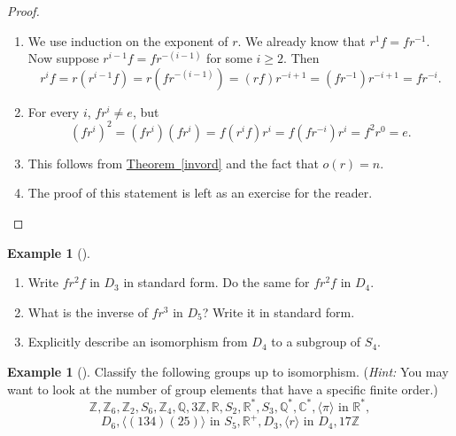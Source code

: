 \documentclass[10pt,]{book}
\theoremstyle{plain}
\theoremstyle{definition}
\theoremstyle{definition}
\theoremstyle{definition}
\newtheorem{example}[theorem]{Example}
\theoremstyle{definition}
\numberwithin{equation}{section}
\def\Z{\mathbb{Z}}
\def\R{\mathbb{R}}
\def\Q{\mathbb{Q}}
\def\C{\mathbb{C}}
\begin{document}
\begin{proof}\hypertarget{proof-34}{}
\leavevmode%
\begin{enumerate}
\item\hypertarget{li-344}{}We use induction on the exponent of \(r\). We already know that \(r^1f=fr^{-1}\).  Now suppose \(r^{i-1}f=fr^{-(i-1)}\) for some \(i\geq 2\).  Then%
\begin{equation*}
r^if=r(r^{i-1}f)=r(fr^{-(i-1)})=(rf)r^{-i+1}=(fr^{-1})r^{-i+1}=fr^{-i}.
\end{equation*}
%
\item\hypertarget{li-345}{}For every \(i\), \(fr^i\neq e\), but%
\begin{equation*}
(fr^i)^2=(fr^i)(fr^i)=f(r^if)r^i=f(fr^{-i})r^i=f^2r^0=e.
\end{equation*}
%
\item\hypertarget{li-346}{}This follows from \hyperref[invord]{Theorem~\ref{invord}} and the fact that \(o(r)=n\).%
\item\hypertarget{li-347}{}The proof of this statement is left as an exercise for the reader.%
\end{enumerate}
\end{proof}
\begin{example}[]\label{example-61}
\leavevmode%
\begin{enumerate}
\item\hypertarget{li-348}{}Write \(fr^2f\) in \(D_3\) in standard form.  Do the same for \(fr^2f\) in \(D_4\).%
\item\hypertarget{li-349}{}What is the inverse of \(fr^3\) in \(D_5\)?  Write it in standard form.%
\item\hypertarget{li-350}{}Explicitly describe an isomorphism from \(D_4\) to a subgroup of \(S_4\).%
\end{enumerate}
\end{example}
\begin{example}[]\label{example-62}
Classify the following groups up to isomorphism. (\emph{Hint:} You may want to look at the number of group elements that have a specific finite order.)%
\begin{equation*}
\Z, \Z_6, \Z_2, S_6, \Z_4, \Q, 3\Z, \R, S_2, \R^*, S_3,\Q^*, \C^*, \langle \pi\rangle \text{ in } \R^*,
\end{equation*}
%
\begin{equation*}
D_6, 
\langle (134)(25)\rangle \text{ in } S_5, \R^+, D_3, \langle r \rangle \text{ in } D_4, 17\Z
\end{equation*}
%
\end{example}
\typeout{************************************************}
\typeout{************************************************}
\end{document}
